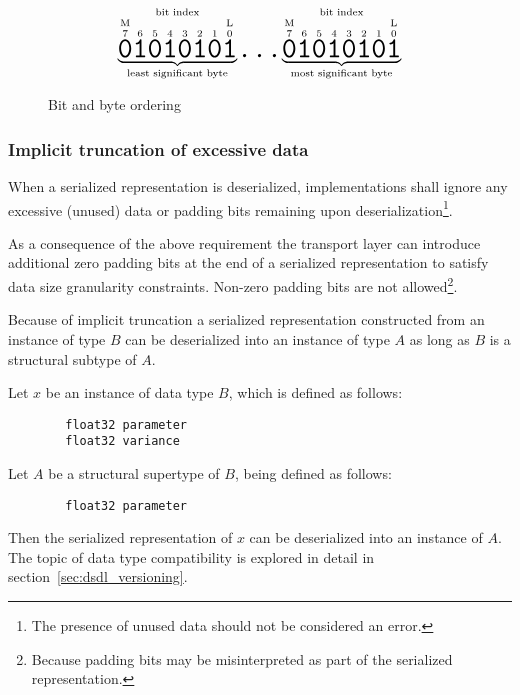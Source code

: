 \begin{figure}[H]
    $$
    \overset{\text{bit index}}{%
        \underbrace{%
            \overset{\text{M}}{\overset{7}{\hugett{0}}}
            \overset{6}{\hugett{1}}
            \overset{5}{\hugett{0}}
            \overset{4}{\hugett{1}}
            \overset{3}{\hugett{0}}
            \overset{2}{\hugett{1}}
            \overset{1}{\hugett{0}}
            \overset{\text{L}}{\overset{0}{\hugett{1}}}
        }_\text{least significant byte}%
    }
    \hugett{\ldots}
    \overset{\text{bit index}}{%
        \underbrace{%
            \overset{\text{M}}{\overset{7}{\hugett{0}}}
            \overset{6}{\hugett{1}}
            \overset{5}{\hugett{0}}
            \overset{4}{\hugett{1}}
            \overset{3}{\hugett{0}}
            \overset{2}{\hugett{1}}
            \overset{1}{\hugett{0}}
            \overset{\text{L}}{\overset{0}{\hugett{1}}}
        }_\text{most significant byte}%
    }
    $$
    \caption{Bit and byte ordering\label{fig:dsdl_serialization_bit_ordering}}
\end{figure}

\subsubsection{Implicit truncation of excessive data}\label{sec:dsdl_serialization_implicit_truncation}

When a serialized representation is deserialized, implementations shall ignore
any excessive (unused) data or padding bits remaining upon deserialization\footnote{%
    The presence of unused data should not be considered an error.
}.

As a consequence of the above requirement the transport layer can introduce
additional zero padding bits at the end of a serialized representation
to satisfy data size granularity constraints.
Non-zero padding bits are not allowed\footnote{%
    Because padding bits may be misinterpreted as part of the serialized representation.
}.

\begin{remark}
    Because of implicit truncation a serialized representation constructed from an instance of type $B$ can be
    deserialized into an instance of type $A$ as long as $B$ is a structural subtype of $A$.

    Let $x$ be an instance of data type $B$, which is defined as follows:

    \begin{verbatim}
        float32 parameter
        float32 variance
    \end{verbatim}

    Let $A$ be a structural supertype of $B$, being defined as follows:

    \begin{verbatim}
        float32 parameter
    \end{verbatim}

    Then the serialized representation of $x$ can be deserialized into an instance of $A$.
    The topic of data type compatibility is explored in detail in section~\ref{sec:dsdl_versioning}.
\end{remark}

